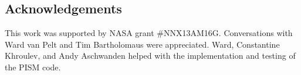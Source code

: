 \documentclass[review,letterpaper]{igs}
\begin{document}
\subsection*{Acknowledgements}  This work was supported by NASA grant \#NNX13AM16G.  Conversations with Ward van Pelt and Tim Bartholomaus were appreciated.  Ward, Constantine Khroulev, and Andy Aschwanden helped with the implementation and testing of the PISM code.



\end{document}
